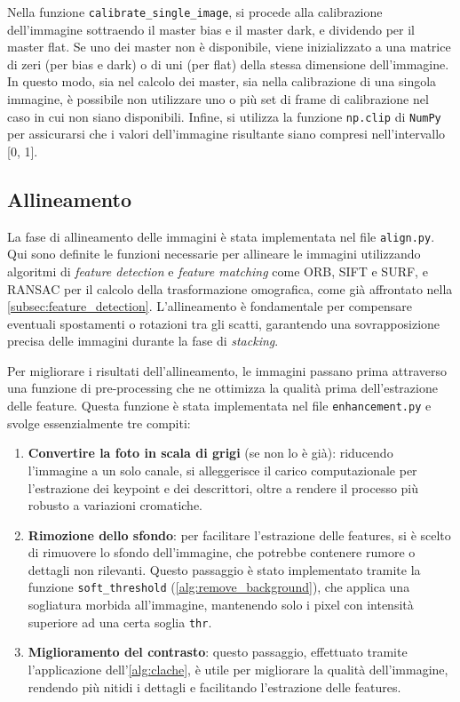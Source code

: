Nella funzione \texttt{calibrate\_single\_image}, si procede alla calibrazione dell'immagine sottraendo il master bias e il master dark, e dividendo per il master flat. Se uno dei master non è disponibile, viene inizializzato a una matrice di zeri (per bias e dark) o di uni (per flat) della stessa dimensione dell'immagine. In questo modo, sia nel calcolo dei master, sia nella calibrazione di una singola immagine, è possibile non utilizzare uno o più set di frame di calibrazione nel caso in cui non siano disponibili. Infine, si utilizza la funzione \texttt{np.clip} di \texttt{NumPy} per assicurarsi che i valori dell'immagine risultante siano compresi nell'intervallo [0, 1].

\subsection{Allineamento} \label{subsec:alignment_impl}

La fase di allineamento delle immagini è stata implementata nel file \texttt{align.py}. Qui sono definite le funzioni necessarie per allineare le immagini utilizzando algoritmi di \textit{feature detection} e \textit{feature matching} come ORB, SIFT e SURF, e RANSAC per il calcolo della trasformazione omografica, come già affrontato nella \cref{subsec:feature_detection}. L'allineamento è fondamentale per compensare eventuali spostamenti o rotazioni tra gli scatti, garantendo una sovrapposizione precisa delle immagini durante la fase di \textit{stacking}.

Per migliorare i risultati dell'allineamento, le immagini passano prima attraverso una funzione di pre-processing che ne ottimizza la qualità prima dell'estrazione delle feature. Questa funzione è stata implementata nel file \texttt{enhancement.py} e svolge essenzialmente tre compiti:

\begin{enumerate}
    \item \textbf{Convertire la foto in scala di grigi} (se non lo è già): riducendo l'immagine a un solo canale, si alleggerisce il carico computazionale per l'estrazione dei keypoint e dei descrittori, oltre a rendere il processo più robusto a variazioni cromatiche.
    
    \item \textbf{Rimozione dello sfondo}: per facilitare l'estrazione delle features, si è scelto di rimuovere lo sfondo dell'immagine, che potrebbe contenere rumore o dettagli non rilevanti. Questo passaggio è stato implementato tramite la funzione \texttt{soft\_threshold} (\cref{alg:remove_background}), che applica una sogliatura morbida all'immagine, mantenendo solo i pixel con intensità superiore ad una certa soglia \texttt{thr}.
    
    \item \textbf{Miglioramento del contrasto}: questo passaggio, effettuato tramite l'applicazione dell'\cref{alg:clache}, è utile per migliorare la qualità dell'immagine, rendendo più nitidi i dettagli e facilitando l'estrazione delle features.
\end{enumerate}

